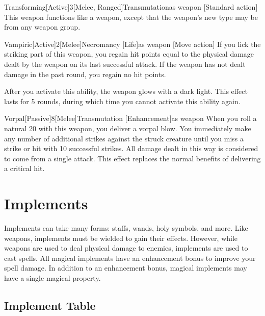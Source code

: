         \begin{magicitemdef}{Transforming}[Active]{3}[Melee, Ranged]{Transmutation}{as weapon}
            [Standard action] This weapon functions like a  weapon, except that the weapon's new type may be from any weapon group.
        \end{magicitemdef}

        \begin{magicitemdef}{Vampiric}[Active]{2}[Melee]{Necromancy [Life]}{as weapon}
            [Move action] If you lick the striking part of this weapon, you regain hit points equal to the physical damage dealt by the weapon on its last successful attack.
            If the weapon has not dealt damage in the past round, you regain no hit points.

            After you activate this ability, the weapon glows with a dark light.
            This effect lasts for 5 rounds, during which time you cannot activate this ability again.
        \end{magicitemdef}

        \begin{magicitemdef}{Vorpal}[Passive]{8}[Melee]{Transmutation [Enhancement]}{as weapon}
             When you roll a natural 20 with this weapon, you deliver a vorpal blow.
            You immediately make any number of additional strikes against the struck creature until you miss a strike or hit with 10 successful strikes.
            All damage dealt in this way is considered to come from a single attack.
            This effect replaces the normal benefits of delivering a critical hit.
        \end{magicitemdef}

\section{Implements}
    Implements can take many forms: staffs, wands, holy symbols, and more.
    Like weapons, implements must be wielded to gain their effects.
    However, while weapons are used to deal physical damage to enemies, implements are used to cast spells.
    All magical implements have an enhancement bonus to improve your spell damage.
    In addition to an enhancement bonus, magical implements may have a single magical property.

    \onecolumn
    \subsection{Implement Table}

